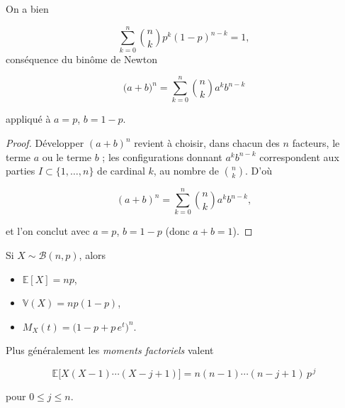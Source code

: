 \medskip

\begin{mdframed}
\begin{proposition}
On a bien 

$$
\sum_{k=0}^n\binom nk p^k(1-p)^{n-k}=1,
$$ 
conséquence du binôme de Newton 

$$
\big(a+b\big)^n=\sum_{k=0}^n\binom nk a^k b^{n-k}
$$
 
appliqué à $a=p$, $b=1-p$.
\end{proposition}
\end{mdframed}

\begin{proof}
Développer $(a+b)^n$ revient à choisir, dans chacun des $n$ facteurs, le terme $a$ ou le terme $b$ ; les configurations donnant $a^k b^{n-k}$ correspondent aux parties $I\subset\{1,\dots,n\}$ de cardinal $k$, au nombre de $\binom nk$. D'où

$$
(a+b)^n=\sum_{k=0}^n\binom nk a^k b^{n-k},
$$ 

et l'on conclut avec $a=p$, $b=1-p$ (donc $a+b=1$).
\end{proof}

\begin{mdframed}
\begin{proposition}
Si $X \sim \mathcal{B}(n,p)$, alors

\begin{itemize}
\item $\mathbb{E}[X]=np$,
\item $\mathbb{V}(X)=np(1-p)$,
\item $ M_X(t)=\big(1-p+p\,e^t\big)^n$.
\end{itemize}

Plus généralement les \textit{moments factoriels} valent 

$$
\mathbb{E}\big[X(X-1)\cdots(X-j+1)\big]=n(n-1)\cdots(n-j+1)\,p^{\,j}
$$ 

pour $0\le j\le n$.
\end{proposition}
\end{mdframed}

